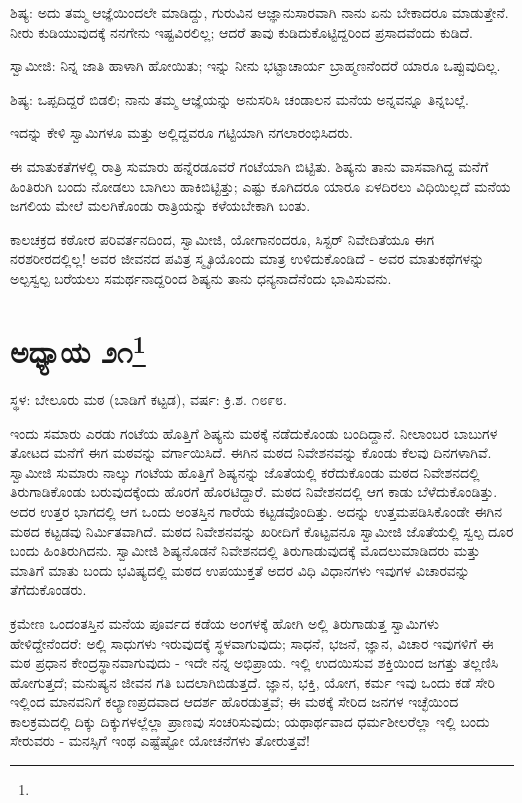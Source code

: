 ಶಿಷ್ಯ: ಅದು ತಮ್ಮ ಆಜ್ಞೆಯಿಂದಲೇ ಮಾಡಿದ್ದು, ಗುರುವಿನ ಆಜ್ಞಾನುಸಾರವಾಗಿ ನಾನು ಏನು ಬೇಕಾದರೂ ಮಾಡುತ್ತೇನೆ. ನೀರು ಕುಡಿಯುವುದಕ್ಕೆ ನನಗೇನು ಇಷ್ಟವಿರಲಿಲ್ಲ; ಆದರೆ ತಾವು ಕುಡಿದುಕೊಟ್ಟಿದ್ದರಿಂದ ಪ್ರಸಾದವೆಂದು ಕುಡಿದೆ.

ಸ್ವಾಮೀಜಿ: ನಿನ್ನ ಜಾತಿ ಹಾಳಾಗಿ ಹೋಯಿತು; ಇನ್ನು ನೀನು ಭಟ್ಟಾಚಾರ್ಯ ಬ್ರಾಹ್ಮಣನೆಂದರೆ ಯಾರೂ ಒಪ್ಪುವುದಿಲ್ಲ.

ಶಿಷ್ಯ: ಒಪ್ಪದಿದ್ದರೆ ಬಿಡಲಿ; ನಾನು ತಮ್ಮ ಆಜ್ಞೆಯನ್ನು ಅನುಸರಿಸಿ ಚಂಡಾಲನ ಮನೆಯ ಅನ್ನವನ್ನೂ ತಿನ್ನಬಲ್ಲೆ.

ಇದನ್ನು ಕೇಳಿ ಸ್ವಾಮಿಗಳೂ ಮತ್ತು ಅಲ್ಲಿದ್ದವರೂ ಗಟ್ಟಿಯಾಗಿ ನಗಲಾರಂಭಿಸಿದರು.

ಈ ಮಾತುಕತೆಗಳಲ್ಲಿ ರಾತ್ರಿ ಸುಮಾರು ಹನ್ನೆರಡೂವರೆ ಗಂಟೆಯಾಗಿ ಬಿಟ್ಟಿತು. ಶಿಷ್ಯನು ತಾನು ವಾಸವಾಗಿದ್ದ ಮನೆಗೆ ಹಿಂತಿರುಗಿ ಬಂದು ನೋಡಲು ಬಾಗಿಲು ಹಾಕಿಬಿಟ್ಟಿತ್ತು; ಎಷ್ಟು ಕೂಗಿದರೂ ಯಾರೂ ಏಳದಿರಲು ವಿಧಿಯಿಲ್ಲದೆ ಮನೆಯ ಜಗಲಿಯ ಮೇಲೆ ಮಲಗಿಕೊಂಡು ರಾತ್ರಿಯನ್ನು ಕಳೆಯಬೇಕಾಗಿ ಬಂತು.

ಕಾಲಚಕ್ರದ ಕಠೋರ ಪರಿವರ್ತನದಿಂದ, ಸ್ವಾಮೀಜಿ, ಯೋಗಾನಂದರೂ, ಸಿಸ್ಟರ್ ನಿವೇದಿತೆಯೂ ಈಗ ನರಶರೀರದಲ್ಲಿಲ್ಲ! ಅವರ ಜೀವನದ ಪವಿತ್ರ ಸ್ಮೃತಿಯೊಂದು ಮಾತ್ರ ಉಳಿದುಕೊಂಡಿದೆ - ಅವರ ಮಾತುಕಥೆಗಳನ್ನು ಅಲ್ಪಸ್ವಲ್ಪ ಬರೆಯಲು ಸಮರ್ಥನಾದ್ದರಿಂದ ಶಿಷ್ಯನು ತಾನು ಧನ್ಯನಾದೆನೆಂದು ಭಾವಿಸುವನು.

\newpage

\chapter[ಅಧ್ಯಾಯ ೨೧]{ಅಧ್ಯಾಯ ೨೧\protect\footnote{}}

\begin{center}
ಸ್ಥಳ: ಬೇಲೂರು ಮಠ (ಬಾಡಿಗೆ ಕಟ್ಟಡ), ವರ್ಷ: ಕ್ರಿ.ಶ. ೧೮೯೮.
\end{center}

ಇಂದು ಸಮಾರು ಎರಡು ಗಂಟೆಯ ಹೊತ್ತಿಗೆ ಶಿಷ್ಯನು ಮಠಕ್ಕೆ ನಡೆದುಕೊಂಡು ಬಂದಿದ್ದಾನೆ. ನೀಲಾಂಬರ ಬಾಬುಗಳ ತೋಟದ ಮನೆಗೆ ಈಗ ಮಠವನ್ನು ವರ್ಗಾಯಿಸಿದೆ. ಈಗಿನ ಮಠದ ನಿವೇಶನವನ್ನು ಕೊಂಡು ಕೆಲವು ದಿನಗಳಾಗಿವೆ. ಸ್ವಾಮೀಜಿ ಸುಮಾರು ನಾಲ್ಕು ಗಂಟೆಯ ಹೊತ್ತಿಗೆ ಶಿಷ್ಯನನ್ನು ಜೊತೆಯಲ್ಲಿ ಕರೆದುಕೊಂಡು ಮಠದ ನಿವೇಶನದಲ್ಲಿ ತಿರುಗಾಡಿಕೊಂಡು ಬರುವುದಕ್ಕೆಂದು ಹೊರಗೆ ಹೊರಟಿದ್ದಾರೆ. ಮಠದ ನಿವೇಶನದಲ್ಲಿ ಆಗ ಕಾಡು ಬೆಳೆದುಕೊಂಡಿತ್ತು. ಅದರ ಉತ್ತರ ಭಾಗದಲ್ಲಿ ಆಗ ಒಂದು ಅಂತಸ್ತಿನ ಗಾರೆಯ ಕಟ್ಟಡವೊಂದಿತ್ತು. ಅದನ್ನು ಉತ್ತಮಪಡಿಸಿಕೊಂಡೇ ಈಗಿನ ಮಠದ ಕಟ್ಟಡವು ನಿರ್ಮಿತವಾಗಿದೆ. ಮಠದ ನಿವೇಶನವನ್ನು ಖರೀದಿಗೆ ಕೊಟ್ಟವನೂ ಸ್ವಾಮೀಜಿ ಜೊತೆಯಲ್ಲಿ ಸ್ವಲ್ಪ ದೂರ ಬಂದು ಹಿಂತಿರುಗಿದನು. ಸ್ವಾಮೀಜಿ ಶಿಷ್ಯನೊಡನೆ ನಿವೇಶನದಲ್ಲಿ ತಿರುಗಾಡುವುದಕ್ಕೆ ಮೊದಲುಮಾಡಿದರು ಮತ್ತು ಮಾತಿಗೆ ಮಾತು ಬಂದು ಭವಿಷ್ಯದಲ್ಲಿ ಮಠದ ಉಪಯುಕ್ತತೆ ಅದರ ವಿಧಿ ವಿಧಾನಗಳು ಇವುಗಳ ವಿಚಾರವನ್ನು ತೆಗೆದುಕೊಂಡರು.

ಕ್ರಮೇಣ ಒಂದಂತಸ್ತಿನ ಮನೆಯ ಪೂರ್ವದ ಕಡೆಯ ಅಂಗಳಕ್ಕೆ ಹೋಗಿ ಅಲ್ಲಿ ತಿರುಗಾಡುತ್ತ ಸ್ವಾಮಿಗಳು ಹೇಳಿದ್ದೇನೆಂದರೆ: ಅಲ್ಲಿ ಸಾಧುಗಳು ಇರುವುದಕ್ಕೆ ಸ್ಥಳವಾಗುವುದು; ಸಾಧನೆ, ಭಜನೆ, ಜ್ಞಾನ, ವಿಚಾರ ಇವುಗಳಿಗೆ ಈ ಮಠ ಪ್ರಧಾನ ಕೇಂದ್ರಸ್ಥಾನವಾಗುವುದು - ಇದೇ ನನ್ನ ಅಭಿಪ್ರಾಯ. ಇಲ್ಲಿ ಉದಯಿಸುವ ಶಕ್ತಿಯಿಂದ ಜಗತ್ತು ತಲ್ಲಣಿಸಿ ಹೋಗುತ್ತದೆ; ಮನುಷ್ಯನ ಜೀವನ ಗತಿ ಬದಲಾಗಿಬಿಡುತ್ತದೆ. ಜ್ಞಾನ, ಭಕ್ತಿ, ಯೋಗ, ಕರ್ಮ ಇವು ಒಂದು ಕಡೆ ಸೇರಿ ಇಲ್ಲಿಂದ ಮಾನವನಿಗೆ ಕಲ್ಯಾಣಪ್ರದವಾದ ಆದರ್ಶ ಹೊರಡುತ್ತವೆ; ಈ ಮಠಕ್ಕೆ ಸೇರಿದ ಜನಗಳ ಇಚ್ಛೆಯಿಂದ ಕಾಲಕ್ರಮದಲ್ಲಿ ದಿಕ್ಕು ದಿಕ್ಕುಗಳಲ್ಲೆಲ್ಲಾ ಪ್ರಾಣವು ಸಂಚರಿಸುವುದು; ಯಥಾರ್ಥವಾದ ಧರ್ಮಶೀಲರೆಲ್ಲಾ ಇಲ್ಲಿ ಬಂದು ಸೇರುವರು - ಮನಸ್ಸಿಗೆ ಇಂಥ ಎಷ್ಟೆಷ್ಟೋ ಯೋಚನೆಗಳು ತೋರುತ್ತವೆ!

